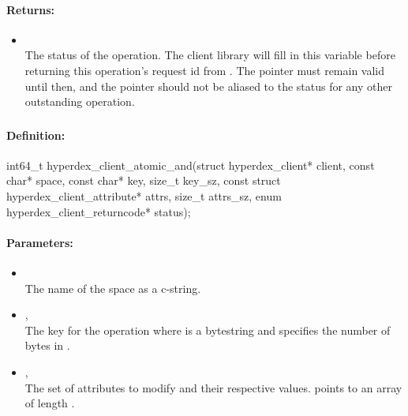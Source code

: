 \paragraph{Returns:}
\begin{itemize}[noitemsep]
\item {}\\
The status of the operation.  The client library will fill in this variable before returning this operation's request id from .  The pointer must remain valid until then, and the pointer should not be aliased to the status for any other outstanding operation.
\end{itemize}

\pagebreak
\subsubsection{}
\label{api:c:atomic_and}


\paragraph{Definition:}
\begin{ccode}
int64_t hyperdex_client_atomic_and(struct hyperdex_client* client,
        const char* space,
        const char* key, size_t key_sz,
        const struct hyperdex_client_attribute* attrs, size_t attrs_sz,
        enum hyperdex_client_returncode* status);
\end{ccode}

\paragraph{Parameters:}
\begin{itemize}[noitemsep]
\item {}\\
The name of the space as a c-string.
\item {}, \\
The key for the operation where  is a bytestring and  specifies the number of bytes in .
\item {}, \\
The set of attributes to modify and their respective values.   points to an array of length .
\end{itemize}


